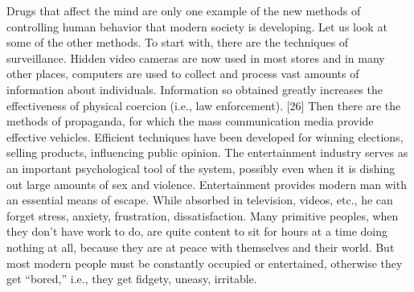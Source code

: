  Drugs that affect the mind are only one example of the new methods of controlling human behavior that modern society is developing. Let us look at some of the other methods.
 To start with, there are the techniques of surveillance. Hidden video cameras are now used in most stores and in many other places, computers are used to collect and process vast amounts of information about individuals. Information so obtained greatly increases the effectiveness of physical coercion (i.e., law enforcement). [26] Then there are the methods of propaganda, for which the mass communication media provide effective vehicles. Efficient techniques have been developed for winning elections, selling products, influencing public opinion. The entertainment industry serves as an important psychological tool of the system, possibly even when it is dishing out large amounts of sex and violence. Entertainment provides modern man with an essential means of escape. While absorbed in television, videos, etc., he can forget stress, anxiety, frustration, dissatisfaction. Many primitive peoples, when they don’t have work to do, are quite content to sit for hours at a time doing nothing at all, because they are at peace with themselves and their world. But most modern people must be constantly occupied or entertained, otherwise they get “bored,” i.e., they get fidgety, uneasy, irritable.
